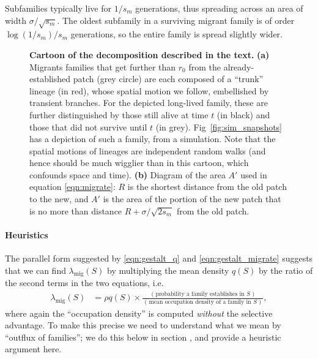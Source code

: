 \documentclass[10pt,letterpaper]{article}
\renewcommand{\P}{\mathbb{P}}
\newcommand{\migrate}{\lambda_\text{mig}}
\newcommand{\secref}[1]{{\emph{\nameref{#1}}}}
\begin{document}
Subfamilies typically live for $1/s_m$ generations,
thus spreading across an area of width $\sigma/\sqrt{s_m}$.
The oldest subfamily in a surviving migrant family 
is of order $\log(1/s_m)/s_m$ generations,
so the entire family is spread slightly wider.

\begin{figure}[ht!!]
  \begin{center}
  \end{center}
  \caption{
      \textbf{Cartoon of the decomposition described in the text.}
      \textbf{(a)} 
    Migrants families that get further than $r_0$ from the already-established patch (grey circle)
    are each composed of a ``trunk'' lineage (in red), whose spatial motion we follow,
    embellished by transient branches.
    For the depicted long-lived family, these are further distinguished by those still alive at time $t$ (in black)
    and those that did not survive until $t$ (in grey).
    Fig~\ref{fig:sim_snapshots} has a depiction of such a family, from a simulation. 
    Note that the spatial motions of lineages are independent random walks
    (and hence should be much wigglier than in this cartoon, which confounds space and time).
      \textbf{(b)} 
      Diagram of the area $A'$ used in equation \eqref{eqn:migrate}:
      $R$ is the shortest distance from the old patch to the new,
      and $A'$ is the area of the portion of the new patch that is no more than distance $R+\sigma/\sqrt{2s_m}$
      from the old patch.
} \label{fig:branching_decomp}
\end{figure}


\paragraph{Heuristics}
\label{ss:heuristics}

The parallel form suggested by \eqref{eqn:gestalt_q} and \eqref{eqn:gestalt_migrate}
suggests that we can find $\migrate(S)$ by multiplying the mean density $q(S)$
by the ratio of the second terms in the two equations,
i.e.
\begin{align} \label{eqn:ratio_gestalt}
  \migrate(S) 
    &= \rho q(S) \times 
    \frac{
        \text{ ( probability a family establishes in $S$ ) }
    }{
        \text{ ( mean occupation density of a family in $S$ ) }
    } ,
\end{align}
where again the ``occupation density'' is computed \emph{without} the selective advantage.
To make this precise we need to understand what we mean by ``outflux of families'';
we do this below in section \secref{ss:hitting_occupation},
and provide a heuristic argument here.
\end{document}
